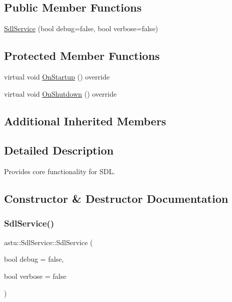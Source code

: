 \subsection*{Public Member Functions}
\begin{DoxyCompactItemize}
\item 
\hyperlink{classastu_1_1SdlService_a9c962eefae3de4c6bb1e64458b6ebb95}{Sdl\+Service} (bool debug=false, bool verbose=false)
\end{DoxyCompactItemize}
\subsection*{Protected Member Functions}
\begin{DoxyCompactItemize}
\item 
virtual void \hyperlink{classastu_1_1SdlService_a2fcb46537de794ab6e4f5e043b26ff60}{On\+Startup} () override
\item 
virtual void \hyperlink{classastu_1_1SdlService_a20d53237efd1c717d773a8ff121b093b}{On\+Shutdown} () override
\end{DoxyCompactItemize}
\subsection*{Additional Inherited Members}


\subsection{Detailed Description}
Provides core functionality for S\+DL. 

\subsection{Constructor \& Destructor Documentation}
\mbox{\label{classastu_1_1SdlService_a9c962eefae3de4c6bb1e64458b6ebb95}} 
\subsubsection{\texorpdfstring{Sdl\+Service()}{SdlService()}}
{\footnotesize\ttfamily astu\+::\+Sdl\+Service\+::\+Sdl\+Service (\begin{DoxyParamCaption}\item[{bool}]{debug = {\ttfamily false},  }\item[{bool}]{verbose = {\ttfamily false} }\end{DoxyParamCaption})}

